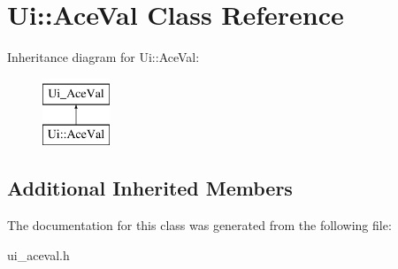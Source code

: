 \hypertarget{classUi_1_1AceVal}{\section{Ui\-:\-:Ace\-Val Class Reference}
\label{classUi_1_1AceVal}
}
Inheritance diagram for Ui\-:\-:Ace\-Val\-:\begin{figure}[H]
\begin{center}
\leavevmode
\includegraphics[height=2.000000cm]{classUi_1_1AceVal}
\end{center}
\end{figure}
\subsection*{Additional Inherited Members}


The documentation for this class was generated from the following file\-:\begin{DoxyCompactItemize}
\item 
ui\-\_\-aceval.\-h\end{DoxyCompactItemize}
